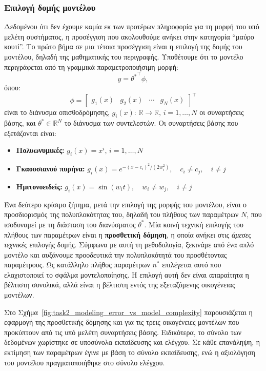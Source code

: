 \documentclass[a4paper,12pt]{article}
\begin{document}
\subsubsection*{Επιλογή δομής μοντέλου}
Δεδομένου ότι δεν έχουμε καμία εκ των προτέρων πληροφορία για τη μορφή του υπό μελέτη συστήματος, η προσέγγιση
που ακολουθούμε ανήκει στην κατηγορία ``μαύρο κουτί''. Το πρώτο βήμα σε μια τέτοια προσέγγιση είναι η επιλογή 
της δομής του μοντέλου, δηλαδή της μαθηματικής του περιγραφής. Υποθέτουμε ότι το μοντέλο περιγράφεται από τη 
γραμμικά παραμετροποιήσιμη μορφή:
\[
    y = {\theta^*}^{\top} \phi,
\]
όπου:
\[
    \phi = 
    \begin{bmatrix}
        g_1(x) & g_2(x) & \cdots & g_N(x)
    \end{bmatrix}^{\top}
\]
είναι το διάνυσμα οπισθοδρόμησης, $g_i(x): \, \mathbb{R} \to \mathbb{R}, \, i = 1,\dots,N$ οι συναρτήσεις 
βάσης, και $\theta^* \in \mathbb{R}^N$ το διάνυσμα των συντελεστών. Οι συναρτήσεις βάσης που εξετάζονται 
είναι:
\begin{itemize}
    \item \textbf{Πολυωνυμικές:} $g_i(x) = x^i, \, i = 1,\dots,N$
    \item \textbf{Γκαουσιανού πυρήνα:} $g_i(x) = e^{-(x - c_i)^2 / (2 w_i^2)}, \quad c_i \neq c_j, \quad i \neq j$
    \item \textbf{Ημιτονοειδείς:} $g_i(x) = \sin(w_i t), \quad w_i \neq w_j, \quad i \neq j$
\end{itemize}

Ένα δεύτερο κρίσιμο ζήτημα, μετά την επιλογή της μορφής του μοντέλου, είναι ο προσδιορισμός της 
πολυπλοκότητας του, δηλαδή του πλήθους των παραμέτρων $N$, που ισοδυναμεί με τη διάσταση του διανύσματος 
$\theta^*$. Μία κοινή τεχνική επιλογής του πλήθους των παραμέτρων είναι η \textbf{προσθετική δόμηση}, η 
οποία ανήκει στις \textit{άμεσες τεχνικές} επιλογής δομής. Σύμφωνα με αυτή τη μεθοδολογία, ξεκινάμε από 
ένα απλό μοντέλο και αυξάνουμε προοδευτικά την πολυπλοκότητά του προσθέτοντας παραμέτρους. Ως κατάλληλο 
πλήθος παραμέτρων $n^*$ επιλέγεται αυτό που ελαχιστοποιεί το σφάλμα μοντελοποίησης. Η επιλογή αυτή δεν 
είναι απαραίτητα η βέλτιστη συνολικά, αλλά είναι η βέλτιστη εντός της εξεταζόμενης οικογένειας μοντέλων.

Στο Σχήμα~\ref{fig:task2_modeling_error_vs_model_complexity} παρουσιάζεται η εφαρμογή της προσθετικής δόμησης 
και για τις τρεις οικογένειες μοντέλων που προκύπτουν από τις υπό μελέτη συναρτήσεις βάσης. Ειδικότερα, το 
σύνολο των δεδομένων χωρίστηκε σε υποσύνολα εκπαίδευσης και ελέγχου. Σε κάθε επανάληψη, η εκτίμηση των 
παραμέτρων έγινε με βάση το σύνολο εκπαίδευσης, ενώ η αξιολόγηση του μοντέλου πραγματοποιήθηκε στο σύνολο
ελέγχου.
\end{document}
